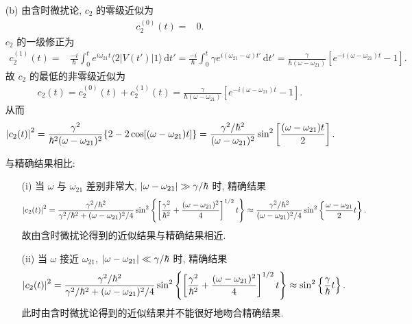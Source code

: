 \documentclass{assignment}
\begin{document}
\begin{sol}
\begin{itemize}
        \item[(b)] 由含时微扰论, $c_2$ 的零级近似为
        \begin{align}
            c_2^{(0)}(t)=&0.
        \end{align}
        $c_2$ 的一级修正为
        \begin{align}
            c_2^{(1)}(t)=&\frac{-i}{\hbar}\int_0^te^{i\omega_{21}t}\langle 2\rvert V(t')\lvert 1\rangle\,\mathrm{d}t'=\frac{-i}{\hbar}\int_0^t\gamma e^{i(\omega_{21}-\omega)t'}\,\mathrm{d}t'=\frac{\gamma}{\hbar(\omega-\omega_{21})}[e^{-i(\omega-\omega_{21})t}-1].
        \end{align}
        故 $c_2$ 的最低的非零级近似为
        \begin{align}
            c_2(t)=c_2^{(0)}(t)+c_2^{(1)}(t)=\frac{\gamma}{\hbar(\omega-\omega_{21})}[e^{-i(\omega-\omega_{21})t}-1].
        \end{align}
        从而
        \begin{align}
            \left\lvert c_2(t)\right\rvert^2=\frac{\gamma^2}{\hbar^2(\omega-\omega_{21})^2}\{2-2\cos[(\omega-\omega_{21})t]\}=\frac{\gamma^2/\hbar^2}{(\omega-\omega_{21})^2}\sin^2\left[\frac{(\omega-\omega_{21})t}{2}\right].
        \end{align}

        与精确结果相比:
        \begin{itemize}
            \item[(i)] 当 $\omega$ 与 $\omega_{21}$ 差别非常大, $\left\lvert\omega-\omega_{21}\right\rvert\gg\gamma/\hbar$ 时, 精确结果
            \begin{align}
                \left\lvert c_2(t)\right\rvert^2=\frac{\gamma^2/\hbar^2}{\gamma^2/\hbar^2+(\omega-\omega_{21})^2/4}\sin^2\left\{\left[\frac{\gamma^2}{\hbar^2}+\frac{(\omega-\omega_{21})^2}{4}\right]^{1/2}t\right\}\approx\frac{\gamma^2/\hbar^2}{(\omega-\omega_{21})^2/4}\sin^2\left\{\frac{\omega-\omega_{21}}{2}t\right\}.
            \end{align}
            故由含时微扰论得到的近似结果与精确结果相近.
            \item[(ii)] 当 $\omega$ 接近 $\omega_{21}$, $\left\lvert\omega-\omega_{21}\right\rvert\ll\gamma/\hbar$ 时, 精确结果
            \begin{align}
                \left\lvert c_2(t)\right\rvert^2=\frac{\gamma^2/\hbar^2}{\gamma^2/\hbar^2+(\omega-\omega_{21})^2/4}\sin^2\left\{\left[\frac{\gamma^2}{\hbar^2}+\frac{(\omega-\omega_{21})^2}{4}\right]^{1/2}t\right\}\approx\sin^2\left\{\frac{\gamma}{\hbar}t\right\}.
            \end{align}
            此时由含时微扰论得到的近似结果并不能很好地吻合精确结果.
        \end{itemize}
    \end{itemize}
\end{sol}
\end{document}
